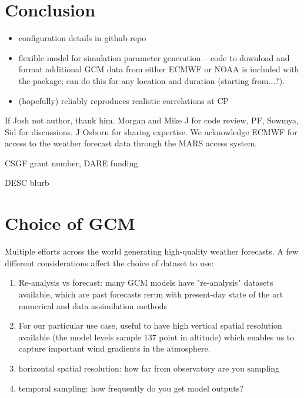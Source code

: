 \documentclass[twocolumn]{aastex631}
\begin{document}
\section{Conclusion}
\begin{itemize}
    \item configuration details in github repo
    \item flexible model for simulation parameter generation -- code to download and format additional GCM data from either ECMWF or NOAA is included with the package; can do this for any location and duration (starting from...?). 
    \item (hopefully) reliably reproduces realistic correlations at CP
\end{itemize}

\begin{acknowledgments}
If Josh not author, thank him. Morgan and Mike J for code review, PF, Sowmya, Sid for discussions. J Osborn for sharing expertise. We acknowledge ECMWF for access to the weather forecast data through the MARS access system.

CSGF grant number, DARE funding

DESC blurb
\end{acknowledgments}

\vspace{5mm}




\appendix
\section{Choice of GCM}\label{sec:gcm}
Multiple efforts across the world generating high-quality weather forecasts. 
A few different considerations affect the choice of dataset to use:
\begin{enumerate}
    \item Re-analysis vs forecast: many GCM models have "re-analysis" datasets available, which are past forecasts rerun with present-day state of the art numerical and data assimilation methods
    \item For our particular use case, useful to have high vertical spatial resolution available (the model levels sample 137 point in altitude) which enables us to capture important wind gradients in the atmosphere.
    \item horizontal spatial resolution: how far from observatory are you sampling
    \item temporal sampling: how frequently do you get model outputs?
\end{enumerate}
\end{document}
